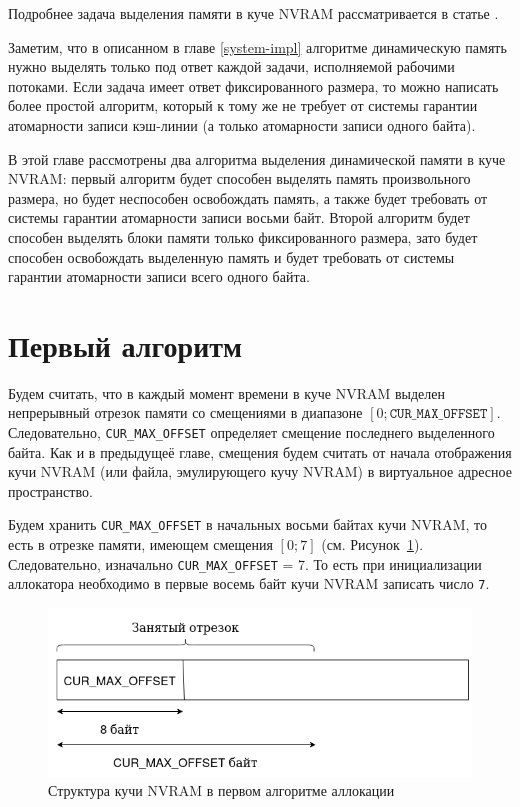 \documentclass[times,specification,annotation]{itmo-student-thesis}
\begin{document}
Подробнее задача выделения памяти в куче NVRAM рассматривается в статье \cite{cai2020understanding}.

Заметим, что в описанном в главе \ref{system-impl} алгоритме динамическую память нужно выделять только под ответ каждой задачи, исполняемой рабочими потоками. Если задача имеет ответ фиксированного размера, то можно написать более простой алгоритм, который к тому же не требует от системы гарантии атомарности записи кэш-линии (а только атомарности записи одного байта).

В этой главе рассмотрены два алгоритма выделения динамической памяти в куче NVRAM: первый алгоритм будет способен выделять память произвольного размера, но будет неспособен освобождать память, а также будет требовать от системы гарантии атомарности записи восьми байт. Второй алгоритм будет способен выделять блоки памяти только фиксированного размера, зато будет способен освобождать выделенную память и будет требовать от системы гарантии атомарности записи всего одного байта.

\section{Первый алгоритм}

Будем считать, что в каждый момент времени в куче NVRAM выделен непрерывный отрезок памяти со смещениями в диапазоне $[0; \texttt{CUR\_MAX\_OFFSET}]$. Следовательно, \texttt{CUR\_MAX\_OFFSET} определяет смещение последнего выделенного байта. Как и в предыдущеё главе, смещения будем считать от начала отображения кучи NVRAM (или файла, эмулирующего кучу NVRAM) в виртуальное адресное пространство.

Будем хранить \texttt{CUR\_MAX\_OFFSET} в начальных восьми байтах кучи NVRAM, то есть в отрезке памяти, имеющем смещения $[0; 7]$ (см. Рисунок~\ref{heap-structure-algorithm-1}). Следовательно, изначально \texttt{CUR\_MAX\_OFFSET} = 7. То есть при инициализации аллокатора необходимо в первые восемь байт кучи NVRAM записать число \texttt{7}.

\begin{figure}[H]
  \centering
  \caption{Структура кучи NVRAM в первом алгоритме аллокации}
  \label{heap-structure-algorithm-1}
  \includegraphics[scale=0.65]{allocation_first.png}
\end{figure}
\end{document}
